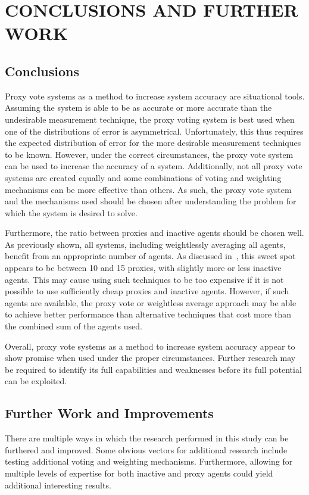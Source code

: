 %
%

\chapter{CONCLUSIONS AND FURTHER WORK}\label{ch:conclusions-and-further-work}

\section{Conclusions}\label{sec:conclusions}
Proxy vote systems as a method to increase system accuracy are situational tools.
Assuming the system is able to be as accurate or more accurate than the undesirable
measurement technique, the proxy voting system is best used when one of the
distributions of error is asymmetrical.
Unfortunately, this thus requires the expected distribution of error for the more
desirable measurement techniques to be known.
However, under the correct circumstances, the proxy vote system can be used to increase
the accuracy of a system.
Additionally, not all proxy vote systems are created equally and some combinations of
voting and weighting mechanisms can be more effective than others.
As such, the proxy vote system and the mechanisms used should be chosen after
understanding the problem for which the system is desired to solve.

Furthermore, the ratio between proxies and inactive agents should be chosen well.
As previously shown, all systems, including weightlessly averaging all agents, benefit
from an appropriate number of agents.
As discussed in~, this sweet spot appears to be between
10 and 15 proxies, with slightly more or less inactive agents.
This may cause using such techniques to be too expensive if it is not possible to use
sufficiently cheap proxies and inactive agents.
However, if such agents are available, the proxy vote or weightless average approach
may be able to achieve better performance than alternative techniques that cost more
than the combined sum of the agents used.

Overall, proxy vote systems as a method to increase system accuracy appear to show
promise when used under the proper circumstances.
Further research may be required to identify its full capabilities and weaknesses
before its full potential can be exploited.

\section{Further Work and Improvements}\label{sec:further-work-and-improvements}
There are multiple ways in which the research performed in this study can be
furthered and improved.
Some obvious vectors for additional research include testing additional voting and
weighting mechanisms.
Furthermore, allowing for multiple levels of expertise for both inactive and proxy
agents could yield additional interesting results.

